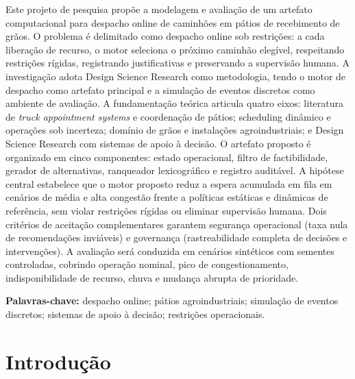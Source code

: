 \documentclass[
  12pt,
  oneside,
  a4paper,
  sumario=tradicional,
  brazil
]{abntex2}
\begin{document}
\tableofcontents*
\cleardoublepage

\begin{resumo}
Este projeto de pesquisa prop\~oe a modelagem e avalia\c{c}\~ao de um artefato computacional para despacho online de caminh\~oes em p\'atios de recebimento de gr\~aos. O problema \'e delimitado como despacho online sob restri\c{c}\~oes: a cada libera\c{c}\~ao de recurso, o motor seleciona o pr\'oximo caminh\~ao eleg\'ivel, respeitando restri\c{c}\~oes r\'igidas, registrando justificativas e preservando a supervis\~ao humana. A investiga\c{c}\~ao adota Design Science Research como metodologia, tendo o motor de despacho como artefato principal e a simula\c{c}\~ao de eventos discretos como ambiente de avalia\c{c}\~ao. A fundamenta\c{c}\~ao te\'orica articula quatro eixos: literatura de \textit{truck appointment systems} e coordena\c{c}\~ao de p\'atios; scheduling din\^amico e opera\c{c}\~oes sob incerteza; dom\'inio de gr\~aos e instala\c{c}\~oes agroindustriais; e Design Science Research com sistemas de apoio \`a decis\~ao. O artefato proposto \'e organizado em cinco componentes: estado operacional, filtro de factibilidade, gerador de alternativas, ranqueador lexicogr\'afico e registro audit\'avel. A hip\'otese central estabelece que o motor proposto reduz a espera acumulada em fila em cen\'arios de m\'edia e alta congest\~ao frente a pol\'iticas est\'aticas e din\^amicas de refer\^encia, sem violar restri\c{c}\~oes r\'igidas ou eliminar supervis\~ao humana. Dois crit\'erios de aceita\c{c}\~ao complementares garantem seguran\c{c}a operacional (taxa nula de recomenda\c{c}\~oes invi\'aveis) e governan\c{c}a (rastreabilidade completa de decis\~oes e interven\c{c}\~oes). A avalia\c{c}\~ao ser\'a conduzida em cen\'arios sint\'eticos com sementes controladas, cobrindo opera\c{c}\~ao nominal, pico de congestionamento, indisponibilidade de recurso, chuva e mudan\c{c}a abrupta de prioridade.

\vspace{\onelineskip}
\noindent
\textbf{Palavras-chave:} despacho online; p\'atios agroindustriais; simula\c{c}\~ao de eventos discretos; sistemas de apoio \`a decis\~ao; restri\c{c}\~oes operacionais.
\end{resumo}
\cleardoublepage

\textual
\OnehalfSpacing

\chapter{Introdu\c{c}\~ao}
\end{document}
